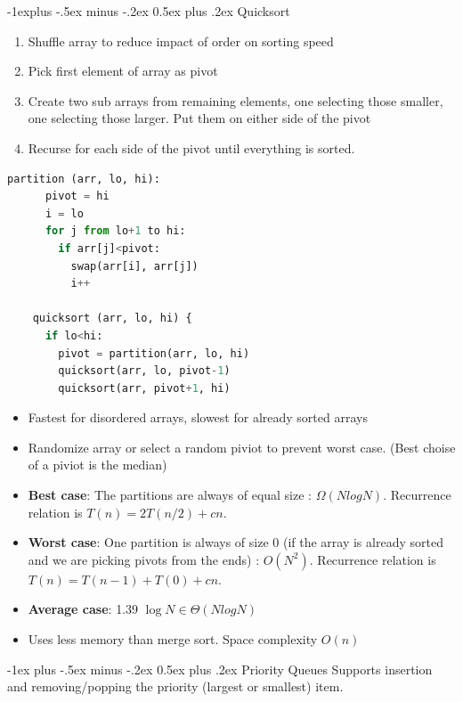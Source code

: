 \documentclass[letterpaper, 8pt]{extarticle}
\makeatletter
\renewcommand{\section}{\@startsection{section}{1}{0mm}%
                                {-1ex plus -.5ex minus -.2ex}%
                                {0.5ex plus .2ex}%
                                {\normalfont\normalsize\bfseries}}
\renewcommand{\subsection}{\@startsection{subsection}{2}{0mm}%
                                {-1explus -.5ex minus -.2ex}%
                                {0.5ex plus .2ex}%
                                {\normalfont\small\bfseries}}
\makeatother
\begin{document}
\begin{multicols*}{5}
  \subsection{Quicksort}
  \begin{enumerate}
    \item Shuffle array to reduce impact of order on sorting speed
    \item Pick first element of array as pivot
    \item Create two sub arrays from remaining elements, one selecting those smaller,
          one selecting those larger. Put them on either side of the pivot
    \item Recurse for each side of the pivot until everything is sorted.
  \end{enumerate}

  \begin{lstlisting}[language=Python, breaklines=true, postbreak=\mbox{\textcolor{red}{$\hookrightarrow$}\space}]
    partition (arr, lo, hi):
      pivot = hi
      i = lo
      for j from lo+1 to hi:
        if arr[j]<pivot:
          swap(arr[i], arr[j])
          i++

    quicksort (arr, lo, hi) {
      if lo<hi:
        pivot = partition(arr, lo, hi)
        quicksort(arr, lo, pivot-1)
        quicksort(arr, pivot+1, hi)
  \end{lstlisting}
  \begin{itemize}
    \item Fastest for disordered arrays, slowest for already sorted arrays
    \item Randomize array or select a random piviot to prevent worst case. (Best choise of a piviot is the median)
    \item \textbf{Best case}: The partitions are always of equal size : $\Omega(NlogN)$. Recurrence relation is $T(n) = 2T(n/2) + cn$.
    \item \textbf{Worst case}: One partition is always of size 0 (if the array is already sorted and we are picking pivots from the ends) : $O(N^2)$. Recurrence relation is $T(n) = T(n - 1) + T(0) + cn$.
    \item \textbf{Average case}: 1.39 $\log{N} \in \Theta(NlogN)$
    \item Uses less memory than merge sort. Space complexity $O(n)$
  \end{itemize}

  \section{Priority Queues}
  Supports insertion and removing/popping the priority (largest or smallest) item.


\end{multicols*}
\end{document}
